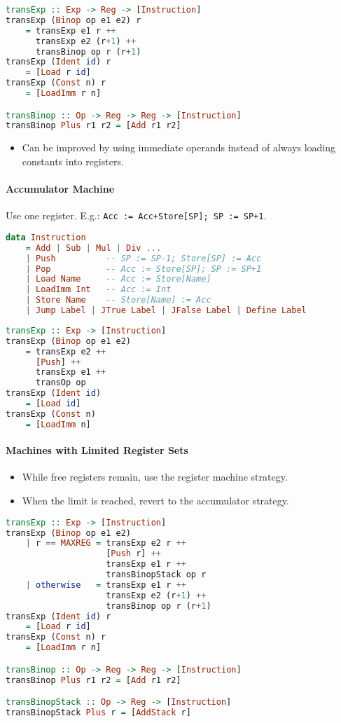 \documentclass[twocolumn,english]{article}
\let\emph\relax
\begin{document}
\begin{lstlisting}[language=Haskell,tabsize=2]
transExp :: Exp -> Reg -> [Instruction]
transExp (Binop op e1 e2) r
	= transExp e1 r ++
	  transExp e2 (r+1) ++
	  transBinop op r (r+1)
transExp (Ident id) r
	= [Load r id]
transExp (Const n) r
	= [LoadImm r n]

transBinop :: Op -> Reg -> Reg -> [Instruction]
transBinop Plus r1 r2 = [Add r1 r2]
\end{lstlisting}
\begin{itemize}
\item Can be improved by using immediate operands instead of always loading
constants into registers. 
\end{itemize}

\paragraph{Accumulator Machine}

Use one register. E.g.\texttt{\emph{ Add}}: \texttt{Acc := Acc+Store{[}SP{]};
SP := SP+1}.
\begin{lstlisting}[language=Haskell,tabsize=2]
data Instruction
	= Add | Sub | Mul | Div ...
	| Push          -- SP := SP-1; Store[SP] := Acc
	| Pop           -- Acc := Store[SP]; SP := SP+1
	| Load Name     -- Acc := Store[Name]
	| LoadImm Int   -- Acc := Int
	| Store Name    -- Store[Name] := Acc
	| Jump Label | JTrue Label | JFalse Label | Define Label
\end{lstlisting}
\begin{lstlisting}[language=Haskell,tabsize=2]
transExp :: Exp -> [Instruction]
transExp (Binop op e1 e2)
	= transExp e2 ++
	  [Push] ++
	  transExp e1 ++
	  transOp op
transExp (Ident id)
	= [Load id]
transExp (Const n)
	= [LoadImm n]
\end{lstlisting}

\paragraph{Machines with Limited Register Sets}
\begin{itemize}
\item While free registers remain, use the register machine strategy. 
\item When the limit is reached, revert to the accumulator strategy. 
\end{itemize}
\begin{lstlisting}[language=Haskell,tabsize=2]
transExp :: Exp -> [Instruction]
transExp (Binop op e1 e2)
	| r == MAXREG = transExp e2 r ++
	                [Push r] ++
	                transExp e1 r ++
	                transBinopStack op r
	| otherwise   = transExp e1 r ++
	                transExp e2 (r+1) ++
	                transBinop op r (r+1)
transExp (Ident id) r
	= [Load r id]
transExp (Const n) r
	= [LoadImm r n]

transBinop :: Op -> Reg -> Reg -> [Instruction]
transBinop Plus r1 r2 = [Add r1 r2]

transBinopStack :: Op -> Reg -> [Instruction]
transBinopStack Plus r = [AddStack r]
\end{lstlisting}
\end{document}
